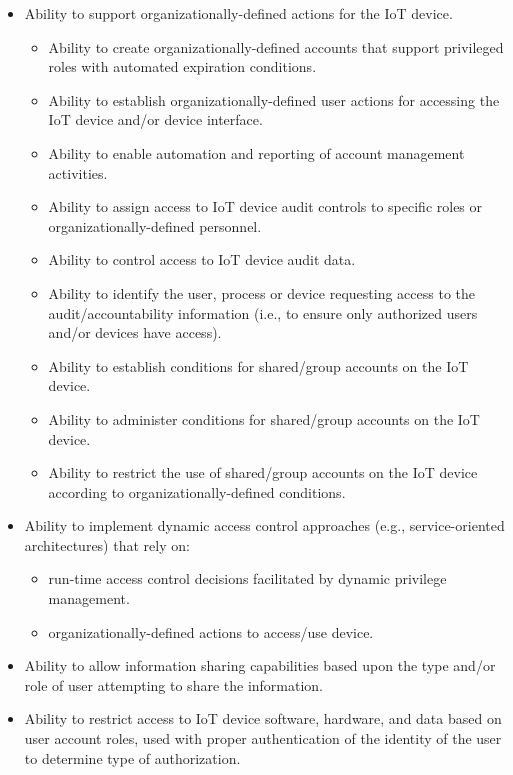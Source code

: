 \begin{description}
\begin{itemize}
        \item Ability to support organizationally-defined actions for the IoT device.
        \begin{itemize}
            \item Ability to create organizationally-defined accounts that support privileged roles with automated expiration conditions.
            \item Ability to establish organizationally-defined user actions for accessing the IoT device and/or device interface.
            \item Ability to enable automation and reporting of account management activities.
            \item Ability to assign access to IoT device audit controls to specific roles or organizationally-defined personnel.
            \item Ability to control access to IoT device audit data.
            \item Ability to identify the user, process or device requesting access to the audit/accountability information (i.e., to ensure only authorized users and/or devices have access).
            \item Ability to establish conditions for shared/group accounts on the IoT device.
            \item Ability to administer conditions for shared/group accounts on the IoT device.
            \item Ability to restrict the use of shared/group accounts on the IoT device according to organizationally-defined conditions.
        \end{itemize}
        \item Ability to implement dynamic access control approaches (e.g., service-oriented architectures) that rely on:
        \begin{itemize}
            \item run-time access control decisions facilitated by dynamic privilege management.
            \item organizationally-defined actions to access/use device.
        \end{itemize}
        \item Ability to allow information sharing capabilities based upon the type and/or role of user attempting to share the information.
        \item Ability to restrict access to IoT device software, hardware, and data based on user account roles, used with proper authentication of the identity of the user to determine type of authorization.
    \end{itemize}
    

\end{description}
